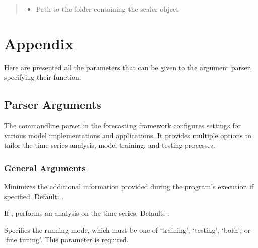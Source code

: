 \documentclass[letterpaper,10pt,english]{sphinxmanual}
\begin{document}
\begin{fulllineitems}
\begin{fulllineitems}
\begin{quote}
\begin{description}
\begin{itemize}
\item {} 
\sphinxAtStartPar
{} \textendash{} Path to the folder containing the scaler object

\end{itemize}

\end{description}\end{quote}

\end{fulllineitems}


\end{fulllineitems}



\chapter{Appendix}
\label{\detokenize{index:appendix}}
\sphinxAtStartPar
Here are presented all the parameters that can be given to the argument parser, specifying their function.

\sphinxstepscope


\section{Parser Arguments}
\label{\detokenize{docs/parser_arguments:parser-arguments}}\label{\detokenize{docs/parser_arguments::doc}}
\sphinxAtStartPar
The command\sphinxhyphen{}line parser in the forecasting framework configures settings for various model implementations and applications. It provides multiple options to tailor the time series analysis, model training, and testing processes.


\subsection{General Arguments}
\label{\detokenize{docs/parser_arguments:general-arguments}}\begin{description}
\sphinxAtStartPar
Minimizes the additional information provided during the program’s execution if specified. Default: .

\sphinxAtStartPar
If , performs an analysis on the time series. Default: .

\sphinxAtStartPar
Specifies the running mode, which must be one of ‘training’, ‘testing’, ‘both’, or ‘fine tuning’. This parameter is required.

\end{description}
\end{document}
